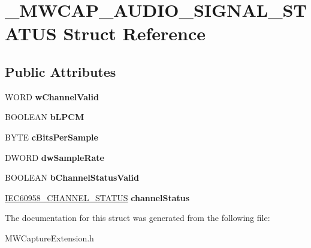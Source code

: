 \hypertarget{struct__MWCAP__AUDIO__SIGNAL__STATUS}{\section{\-\_\-\-M\-W\-C\-A\-P\-\_\-\-A\-U\-D\-I\-O\-\_\-\-S\-I\-G\-N\-A\-L\-\_\-\-S\-T\-A\-T\-U\-S Struct Reference}
\label{struct__MWCAP__AUDIO__SIGNAL__STATUS}
}
\subsection*{Public Attributes}
\begin{DoxyCompactItemize}
\item 
\hypertarget{struct__MWCAP__AUDIO__SIGNAL__STATUS_adc7521d3dbe56836623a34420989acb1}{W\-O\-R\-D {\bfseries w\-Channel\-Valid}}\label{struct__MWCAP__AUDIO__SIGNAL__STATUS_adc7521d3dbe56836623a34420989acb1}

\item 
\hypertarget{struct__MWCAP__AUDIO__SIGNAL__STATUS_a2e473a608d61d1a0407608cd48b2cb6b}{B\-O\-O\-L\-E\-A\-N {\bfseries b\-L\-P\-C\-M}}\label{struct__MWCAP__AUDIO__SIGNAL__STATUS_a2e473a608d61d1a0407608cd48b2cb6b}

\item 
\hypertarget{struct__MWCAP__AUDIO__SIGNAL__STATUS_a8819d4e978c90cbf09392e1afcba9ce2}{B\-Y\-T\-E {\bfseries c\-Bits\-Per\-Sample}}\label{struct__MWCAP__AUDIO__SIGNAL__STATUS_a8819d4e978c90cbf09392e1afcba9ce2}

\item 
\hypertarget{struct__MWCAP__AUDIO__SIGNAL__STATUS_acf44de2efad45351a76e4184b72f2642}{D\-W\-O\-R\-D {\bfseries dw\-Sample\-Rate}}\label{struct__MWCAP__AUDIO__SIGNAL__STATUS_acf44de2efad45351a76e4184b72f2642}

\item 
\hypertarget{struct__MWCAP__AUDIO__SIGNAL__STATUS_aa4cb3e0b1f364082bf6f2ee3e455cb26}{B\-O\-O\-L\-E\-A\-N {\bfseries b\-Channel\-Status\-Valid}}\label{struct__MWCAP__AUDIO__SIGNAL__STATUS_aa4cb3e0b1f364082bf6f2ee3e455cb26}

\item 
\hypertarget{struct__MWCAP__AUDIO__SIGNAL__STATUS_a20fc805d8622e4e0a6a7b3ef3b12f26c}{\hyperlink{union__IEC60958__CHANNEL__STATUS}{I\-E\-C60958\-\_\-\-C\-H\-A\-N\-N\-E\-L\-\_\-\-S\-T\-A\-T\-U\-S} {\bfseries channel\-Status}}\label{struct__MWCAP__AUDIO__SIGNAL__STATUS_a20fc805d8622e4e0a6a7b3ef3b12f26c}

\end{DoxyCompactItemize}


The documentation for this struct was generated from the following file\-:\begin{DoxyCompactItemize}
\item 
M\-W\-Capture\-Extension.\-h\end{DoxyCompactItemize}
